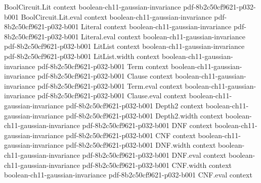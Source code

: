 \begin{theorem}
\leanok
{}
\proofstep
  {BoolCircuit.Lit}
  {context}
  {boolean-ch11-gaussian-invariance}
  {pdf-8b2c50cf9621-p032-b001}
\proofstep
  {BoolCircuit.Lit.eval}
  {context}
  {boolean-ch11-gaussian-invariance}
  {pdf-8b2c50cf9621-p032-b001}
\proofstep
  {Literal}
  {context}
  {boolean-ch11-gaussian-invariance}
  {pdf-8b2c50cf9621-p032-b001}
\proofstep
  {Literal.eval}
  {context}
  {boolean-ch11-gaussian-invariance}
  {pdf-8b2c50cf9621-p032-b001}
\proofstep
  {LitList}
  {context}
  {boolean-ch11-gaussian-invariance}
  {pdf-8b2c50cf9621-p032-b001}
\proofstep
  {LitList.width}
  {context}
  {boolean-ch11-gaussian-invariance}
  {pdf-8b2c50cf9621-p032-b001}
\proofstep
  {Term}
  {context}
  {boolean-ch11-gaussian-invariance}
  {pdf-8b2c50cf9621-p032-b001}
\proofstep
  {Clause}
  {context}
  {boolean-ch11-gaussian-invariance}
  {pdf-8b2c50cf9621-p032-b001}
\proofstep
  {Term.eval}
  {context}
  {boolean-ch11-gaussian-invariance}
  {pdf-8b2c50cf9621-p032-b001}
\proofstep
  {Clause.eval}
  {context}
  {boolean-ch11-gaussian-invariance}
  {pdf-8b2c50cf9621-p032-b001}
\proofstep
  {Depth2}
  {context}
  {boolean-ch11-gaussian-invariance}
  {pdf-8b2c50cf9621-p032-b001}
\proofstep
  {Depth2.width}
  {context}
  {boolean-ch11-gaussian-invariance}
  {pdf-8b2c50cf9621-p032-b001}
\proofstep
  {DNF}
  {context}
  {boolean-ch11-gaussian-invariance}
  {pdf-8b2c50cf9621-p032-b001}
\proofstep
  {CNF}
  {context}
  {boolean-ch11-gaussian-invariance}
  {pdf-8b2c50cf9621-p032-b001}
\proofstep
  {DNF.width}
  {context}
  {boolean-ch11-gaussian-invariance}
  {pdf-8b2c50cf9621-p032-b001}
\proofstep
  {DNF.eval}
  {context}
  {boolean-ch11-gaussian-invariance}
  {pdf-8b2c50cf9621-p032-b001}
\proofstep
  {CNF.width}
  {context}
  {boolean-ch11-gaussian-invariance}
  {pdf-8b2c50cf9621-p032-b001}
\proofstep
  {CNF.eval}
  {context}

\end{theorem}

